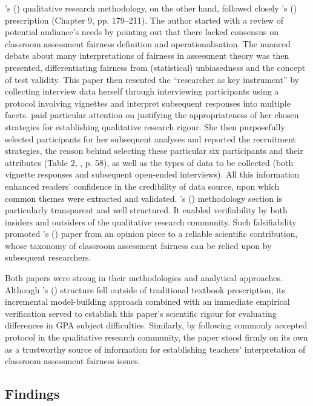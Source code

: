 \documentclass[
    a4paper,            %
    12pt,               %
    stu,                %
    noextraspace,       %
    floatsintext,       %
    biblatex,           %
    colorlinks=true,        %
    linkcolor=red,          %
    anchorcolor=black,      %
    citecolor=blue,         %
    urlcolor=blue,          %
    bookmarks=true,         %
    bookmarksopen=false,    %
    bookmarksnumbered=true  %
    margin=2cm              %
]{apa7}
\newcommand{\poscite}[1]{\citeauthor{#1}'s (\citeyear{#1})}
\begin{document}
\poscite{tierney:2014} qualitative research methodology, on the other hand, followed closely \poscite{creswell:2018} prescription (Chapter 9, pp. 179--211). The author started with a review of potential audiance's needs by pointing out that there lacked consensus on classroom assessment fairness definition and operationalisation. The nuanced debate about many interpretations of fairness in assessment theory was then presented, differentiating fairness from (statistical) unbiasedness and the concept of test validity. This paper then resented the ``researcher as key instrument'' \parencite[][p. 181]{creswell:2018} by collecting interview data herself through interviewing participants using a protocol involving vignettes and interpret subsequent responses into multiple facets. \citeauthor{tierney:2014} paid particular attention on justifying the appropriateness of her chosen strategies for establishing qualitative research rigour. She then purposefully selected participants for her subsequent analyses and reported the recruitment strategies, the reason behind selecting these particular six participants and their attributes (Table 2, \textcite{tierney:2014}, p. 58), as well as the types of data to be collected (both vignette responses and subsequent open-ended interviews). All this information enhanced readers' confidence in the credibility of data source, upon which common themes were extracted and validated. \poscite{tierney:2014} methodology section is particularly transparent and well structured. It enabled verifiability by both insiders and outsiders of the qualitative research community. Such falsifiability promoted \poscite{tierney:2014} paper from an opinion piece to a reliable scientific contribution, whose taxonomy of classroom assessment fairness can be relied upon by subsequent researchers.

Both papers were strong in their methodologies and analytical approaches. Although \poscite{korobko:2008} structure fell outside of traditional textbook prescription, its incremental model-building approach combined with an immediate empirical verification served to establish this paper's scientific rigour for evaluating differences in GPA subject difficulties. Similarly, by following commonly accepted protocol in the qualitative research community, the \textcite{tierney:2014} paper stood firmly on its own as a trustworthy source of information for establishing teachers' interpretation of classroom assessment fairness issues.

\subsection{Findings}
\end{document}

